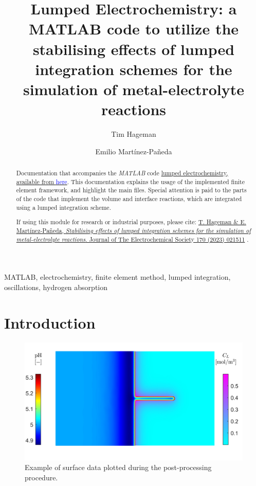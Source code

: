 \documentclass[3p]{elsarticle} %
\newcommand{\citeMe}{\href{http://www.doi.org/10.1149/1945-7111/acb971}{T. Hageman \& E. Martínez-Pañeda, \textit{Stabilising effects of lumped integration schemes for the simulation of metal-electrolyte reactions}. Journal of The Electrochemical Society 170 (2023) 021511} \citep{Hageman2023}}
\begin{document}
\begin{frontmatter}
\title{Lumped Electrochemistry: a MATLAB code to utilize the stabilising effects of lumped integration schemes for the simulation of metal-electrolyte reactions}

\author{Tim Hageman }
\author{Emilio Martínez-Pañeda}

\address{Department of Civil and Environmental Engineering, Imperial College London, London SW7 2AZ, UK}

\begin{abstract}
Documentation that accompanies the \textit{MATLAB} code \href{https://github.com/T-Hageman/Lumped_Electrochemistry}{lumped electrochemistry, available from \textcolor{blue}{here}}. This documentation explains the usage of the implemented finite element framework, and highlight the main files. Special attention is paid to the parts of the code that implement the volume and interface reactions, which are integrated using a lumped integration scheme. 

If using this module for research or industrial purposes, please cite: \citeMe{}.
\end{abstract}

\begin{keyword}
MATLAB, electrochemistry, finite element method, lumped integration, oscillations, hydrogen absorption
\end{keyword}

\end{frontmatter}

\tableofcontents

\section{Introduction}
\begin{figure}
    \centering
    \includegraphics[width=12cm]{../Figures/SurfacePlot.jpg}
    \caption{Example of surface data plotted during the post-processing procedure.}
    \label{fig:example_surf}
\end{figure}
\end{document}
